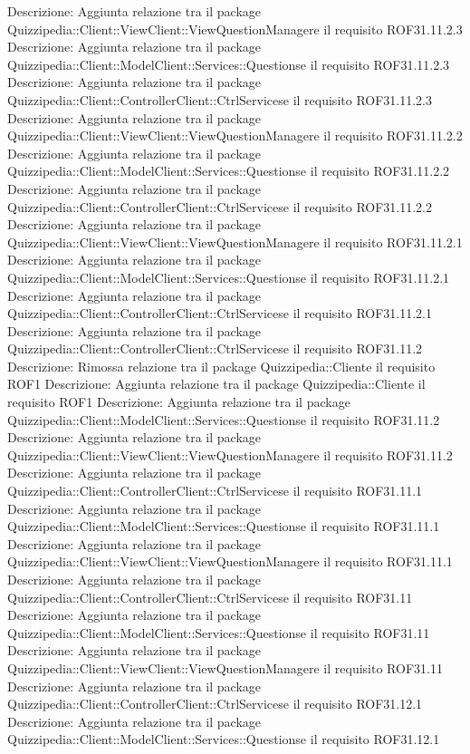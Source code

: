 Descrizione: Aggiunta relazione tra il package Quizzipedia::Client::ViewClient::ViewQuestionManagere il requisito ROF31.11.2.3 
Descrizione: Aggiunta relazione tra il package Quizzipedia::Client::ModelClient::Services::Questionse il requisito ROF31.11.2.3 
Descrizione: Aggiunta relazione tra il package Quizzipedia::Client::ControllerClient::CtrlServicese il requisito ROF31.11.2.3 
Descrizione: Aggiunta relazione tra il package Quizzipedia::Client::ViewClient::ViewQuestionManagere il requisito ROF31.11.2.2 
Descrizione: Aggiunta relazione tra il package Quizzipedia::Client::ModelClient::Services::Questionse il requisito ROF31.11.2.2 
Descrizione: Aggiunta relazione tra il package Quizzipedia::Client::ControllerClient::CtrlServicese il requisito ROF31.11.2.2 
Descrizione: Aggiunta relazione tra il package Quizzipedia::Client::ViewClient::ViewQuestionManagere il requisito ROF31.11.2.1 
Descrizione: Aggiunta relazione tra il package Quizzipedia::Client::ModelClient::Services::Questionse il requisito ROF31.11.2.1 
Descrizione: Aggiunta relazione tra il package Quizzipedia::Client::ControllerClient::CtrlServicese il requisito ROF31.11.2.1 
Descrizione: Aggiunta relazione tra il package Quizzipedia::Client::ControllerClient::CtrlServicese il requisito ROF31.11.2 
Descrizione: Rimossa relazione tra il package Quizzipedia::Cliente il requisito ROF1 
Descrizione: Aggiunta relazione tra il package Quizzipedia::Cliente il requisito ROF1 
Descrizione: Aggiunta relazione tra il package Quizzipedia::Client::ModelClient::Services::Questionse il requisito ROF31.11.2 
Descrizione: Aggiunta relazione tra il package Quizzipedia::Client::ViewClient::ViewQuestionManagere il requisito ROF31.11.2 
Descrizione: Aggiunta relazione tra il package Quizzipedia::Client::ControllerClient::CtrlServicese il requisito ROF31.11.1 
Descrizione: Aggiunta relazione tra il package Quizzipedia::Client::ModelClient::Services::Questionse il requisito ROF31.11.1 
Descrizione: Aggiunta relazione tra il package Quizzipedia::Client::ViewClient::ViewQuestionManagere il requisito ROF31.11.1 
Descrizione: Aggiunta relazione tra il package Quizzipedia::Client::ControllerClient::CtrlServicese il requisito ROF31.11 
Descrizione: Aggiunta relazione tra il package Quizzipedia::Client::ModelClient::Services::Questionse il requisito ROF31.11 
Descrizione: Aggiunta relazione tra il package Quizzipedia::Client::ViewClient::ViewQuestionManagere il requisito ROF31.11 
Descrizione: Aggiunta relazione tra il package Quizzipedia::Client::ControllerClient::CtrlServicese il requisito ROF31.12.1 
Descrizione: Aggiunta relazione tra il package Quizzipedia::Client::ModelClient::Services::Questionse il requisito ROF31.12.1 
